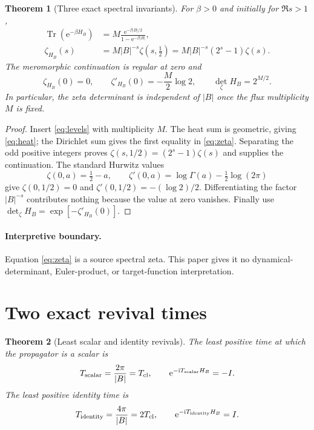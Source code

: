 \documentclass[10pt]{article}
\newcommand{\e}{\mathrm e}
\newcommand{\ii}{\mathrm i}
\newcommand{\Tr}{\operatorname{Tr}}
\newtheorem{theorem}{Theorem}
\begin{document}
\begin{theorem}[Three exact spectral invariants]\label{thm:zeta}
For $\beta>0$ and initially for $\Re s>1$,
\begin{align}
 \Tr(\e^{-\beta H_B})
   &=M\frac{\e^{-\beta|B|/2}}{1-\e^{-\beta|B|}}, \label{eq:heat}\\
 \zeta_{H_B}(s)
   &=M|B|^{-s}\zeta(s,\tfrac12)
     =M|B|^{-s}(2^s-1)\zeta(s).                 \label{eq:zeta}
\end{align}
The meromorphic continuation is regular at zero and
\begin{equation}
 \zeta_{H_B}(0)=0,\qquad
 \zeta'_{H_B}(0)=-\frac{M}{2}\log2,\qquad
 \det_{\zeta}H_B=2^{M/2}.                       \label{eq:det}
\end{equation}
In particular, the zeta determinant is independent of $|B|$ once the flux
multiplicity $M$ is fixed.
\end{theorem}

\begin{proof}
Insert \eqref{eq:levels} with multiplicity $M$.  The heat sum is geometric,
giving \eqref{eq:heat}; the Dirichlet sum gives the first equality in
\eqref{eq:zeta}.  Separating the odd positive integers proves
$\zeta(s,1/2)=(2^s-1)\zeta(s)$ and supplies the continuation.  The standard
Hurwitz values
\[
 \zeta(0,a)=\tfrac12-a,\qquad
 \zeta'(0,a)=\log\Gamma(a)-\tfrac12\log(2\pi)
\]
give $\zeta(0,1/2)=0$ and $\zeta'(0,1/2)=-(\log2)/2$.  Differentiating the
factor $|B|^{-s}$ contributes nothing because the value at zero vanishes.
Finally use $\det_\zeta H_B=\exp[-\zeta'_{H_B}(0)]$.
\end{proof}

\paragraph{Interpretive boundary.}
Equation \eqref{eq:zeta} is a source spectral zeta.  This paper gives it no
dynamical-determinant, Euler-product, or target-function interpretation.

\section{Two exact revival times}

\begin{theorem}[Least scalar and identity revivals]\label{thm:revival}
The least positive time at which the propagator is a scalar is
\[
 T_{\rm scalar}=\frac{2\pi}{|B|}=T_{\rm cl},
 \qquad \e^{-\ii T_{\rm scalar}H_B}=-I.
\]
The least positive identity time is
\[
 T_{\rm identity}=\frac{4\pi}{|B|}=2T_{\rm cl},
 \qquad \e^{-\ii T_{\rm identity}H_B}=I.
\]
\end{theorem}
\end{document}
